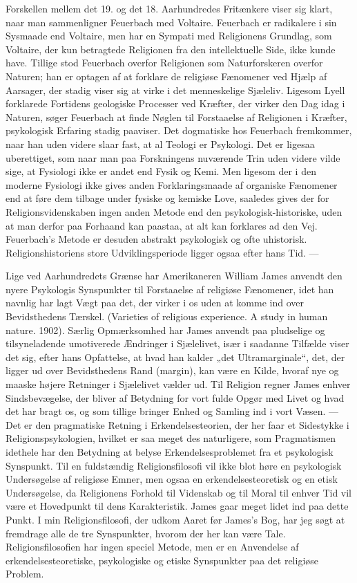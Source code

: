 \documentclass[12pt,a4paper,openany]{book}
\newcommand{\opage}[1]{\marginnote{\footnotesize\textit{[#1]}}}
\begin{document}
Forskellen mellem det 19. og det 18. Aarhundredes Fritænkere
viser sig klart, naar man sammenligner Feuerbach med Voltaire.
Feuerbach er radikalere i sin Sysmaade end Voltaire, men har en
Sympati med Religionens Grundlag, som Voltaire, der kun betragtede
Religionen fra den intellektuelle Side, ikke kunde have. Tillige
stod Feuerbach overfor Religionen som Naturforskeren overfor Naturen;
han er optagen af at forklare de religiøse Fænomener ved
Hjælp af Aarsager, der stadig viser sig at virke i det menneskelige
Sjæleliv. Ligesom Lyell forklarede Fortidens geologiske Processer
ved Kræfter, der virker den Dag idag i Naturen, søger Feuerbach
at finde Nøglen til Forstaaelse af Religionen i Kræfter, psykologisk
Erfaring stadig paaviser. Det dogmatiske hos Feuerbach fremkommer,
naar han uden videre slaar fast, at al Teologi er Psykologi.
Det er ligesaa uberettiget, som naar man paa Forskningens nuværende
Trin uden videre vilde sige, at Fysiologi ikke er andet end
Fysik og Kemi. Men ligesom der i den moderne Fysiologi ikke gives
anden Forklaringsmaade af organiske Fænomener end at føre dem
tilbage under fysiske og kemiske Love, saaledes gives der for Religionsvidenskaben
ingen anden Metode end den psykologisk-historiske,
uden at man derfor paa Forhaand kan paastaa, at alt kan forklares
ad den Vej. Feuerbach’s Metode er desuden abstrakt psykologisk
og ofte uhistorisk. Religionshistoriens store Udviklingsperiode
ligger ogsaa efter hans Tid. ---

\opage{134}Lige ved Aarhundredets Grænse har Amerikaneren William James
anvendt den nyere Psykologis Synspunkter til Forstaaelse af religiøse
Fænomener, idet han navnlig har lagt Vægt paa det, der virker
i os uden at komme ind over Bevidsthedens Tærskel. (Varieties of
religious experience. A study in human nature. 1902). Særlig Opmærksomhed
har James anvendt paa pludselige og tilsyneladende
umotiverede Ændringer i Sjælelivet, især i saadanne Tilfælde viser
det sig, efter hans Opfattelse, at hvad han kalder „det Ultramarginale“,
det, der ligger ud over Bevidsthedens Rand (margin), kan
være en Kilde, hvoraf nye og maaske højere Retninger i Sjælelivet
vælder ud. Til Religion regner James enhver Sindsbevægelse, der
bliver af Betydning for vort fulde Opgør med Livet og hvad det har
bragt os, og som tillige bringer Enhed og Samling ind i vort Væsen.
--- Det er den pragmatiske Retning i Erkendelsesteorien, der her
faar et Sidestykke i Religionspsykologien, hvilket er saa meget des
naturligere, som Pragmatismen idethele har den Betydning at belyse
Erkendelsesproblemet fra et psykologisk Synspunkt. Til en fuldstændig
Religionsfilosofi vil ikke blot høre en psykologisk Undersøgelse
af religiøse Emner, men ogsaa en erkendelsesteoretisk og en etisk
Undersøgelse, da Religionens Forhold til Videnskab og til Moral til
enhver Tid vil være et Hovedpunkt til dens Karakteristik. James
gaar meget lidet ind paa dette Punkt. I min Religionsfilosofi, der udkom
Aaret før James’s Bog, har jeg søgt at fremdrage alle de tre
Synspunkter, hvorom der her kan være Tale. Religionsfilosofien har
ingen speciel Metode, men er en Anvendelse af erkendelsesteoretiske,
psykologiske og etiske Synspunkter paa det religiøse Problem.
\end{document}
